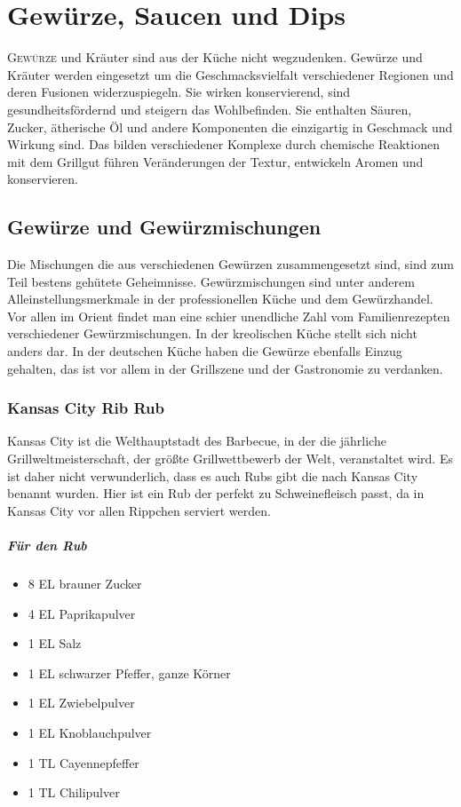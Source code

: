 \chapter{Gewürze, Saucen und Dips}\label{Chapter7}
\lettrine[lines=3]{G}{ewürze} und Kräuter sind aus der Küche nicht 
wegzudenken. 
Gewürze und Kräuter werden eingesetzt um die Geschmacksvielfalt 
verschiedener Regionen
und deren Fusionen widerzuspiegeln.
Sie wirken konservierend, sind gesundheitsfördernd und steigern das 
Wohlbefinden.
Sie enthalten Säuren, Zucker, ätherische Öl und andere Komponenten die 
einzigartig in
Geschmack und Wirkung sind. Das bilden verschiedener Komplexe durch 
chemische 
Reaktionen mit dem Grillgut führen Veränderungen der Textur, entwickeln 
Aromen und konservieren.
   

\section{Gewürze und Gewürzmischungen}
Die Mischungen die aus verschiedenen Gewürzen zusammengesetzt sind, sind 
zum Teil bestens gehütete Geheimnisse. Gewürzmischungen  sind unter anderem 
Alleinstellungsmerkmale
in der professionellen Küche und dem Gewürzhandel. Vor allen im Orient findet 
man eine schier
unendliche Zahl vom Familienrezepten verschiedener Gewürzmischungen. In 
der kreolischen Küche  stellt sich nicht anders dar.
In der deutschen Küche haben die Gewürze ebenfalls Einzug gehalten, das ist 
vor allem in der Grillszene und der Gastronomie zu verdanken.

\subsection{Kansas City Rib Rub}\label{Kansas}
Kansas City ist die Welthauptstadt des Barbecue, in der die jährliche 
Grillweltmeisterschaft, der größte Grillwettbewerb  der Welt,  veranstaltet wird. 
Es ist daher nicht verwunderlich, dass es auch Rubs gibt die nach Kansas City 
benannt wurden. Hier ist ein Rub der perfekt zu Schweinefleisch passt, da in 
Kansas City vor allen Rippchen serviert werden.
\paragraph{Für den Rub}

\begin{itemize}[noitemsep]
	\item 8 EL brauner Zucker
	\item 4 EL Paprikapulver
	\item 1 EL Salz
	\item 1 EL schwarzer Pfeffer, ganze Körner
	\item 1 EL Zwiebelpulver
	\item 1 EL Knoblauchpulver
	\item 1 TL Cayennepfeffer
	\item 1 TL Chilipulver
\end{itemize}

